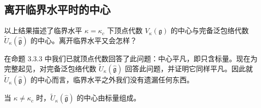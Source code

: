 
\subsection{离开临界水平时的中心}

以上结果描述了临界水平 $\kappa=\kappa_c$ 下顶点代数 $V_\kappa(\mathfrak{g})$ 的中心与完备泛包络代数 $\widetilde{U}_\kappa(\hat{\mathfrak{g}})$ 的中心。离开临界水平又会怎样？

在命题 3.3.3 中我们已就顶点代数回答了此问题：中心平凡，即只含标量。现在为完整起见，对完备泛包络代数 $\widetilde{U}_\kappa(\hat{\mathfrak{g}})$ 回答此问题，并证明它同样平凡。因此就 $\widetilde{U}_\kappa(\hat{\mathfrak{g}})$ 的中心而言，临界水平之外我们没有遗漏任何东西。

\begin{proposition}
    当 $\kappa\ne\kappa_c$ 时，$\widetilde{U}_\kappa(\hat{\mathfrak{g}})$ 的中心由标量组成。
\end{proposition}

